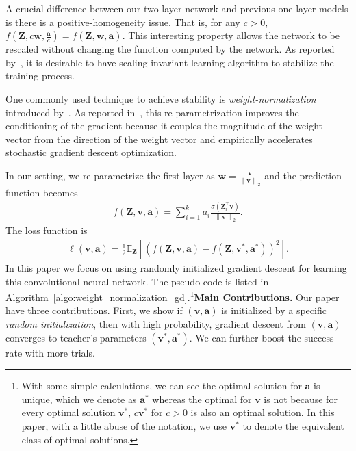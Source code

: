 \documentclass{article}
\newcommand{\firstlayerWN}{v}
\newcommand{\secondlayer}{a}
\def\va{\mathbf{a}}
\def\vv{\mathbf{v}}
\newcommand{\mat}[1]{\mathbf{#1}}
\newcommand{\vect}[1]{\mathbf{#1}}
\newcommand{\norm}[1]{\left\|#1\right\|}
\newcommand{\expect}{\mathbb{E}}
\newcommand{\relu}[1]{\sigma\left(#1\right)}
\begin{document}
A crucial difference between our two-layer network and previous one-layer models is there is a positive-homogeneity issue.
That is, for any $c > 0$, $f\left(\mat{Z},c\vect{w},\frac{\vect{\secondlayer}}{c}\right) = f\left(\mat{Z},\vect{w},\vect{\secondlayer}\right)$.
This interesting
property allows the network to be rescaled without changing the function computed by the network.
As reported by~\cite{neyshabur2015path}, it is desirable to have scaling-invariant learning algorithm to stabilize the training process.

One commonly used technique to achieve stability is \emph{weight-normalization} introduced by~\citet{salimans2016weight}.
As reported in~\cite{salimans2016weight}, this re-parametrization improves the conditioning of the gradient  because it couples the magnitude of the weight vector from the direction of the weight vector and empirically accelerates  stochastic gradient descent optimization.



In our setting, we re-parametrize the first layer as $\vect{w} = \frac{\vect{\firstlayerWN}}{\norm{\vect{\firstlayerWN}}_2}$ and the prediction function becomes
\begin{align}
f\left(\mat{Z},\vect{\firstlayerWN},\vect{\secondlayer}\right) = \sum_{i=1}^{k} {\secondlayer}_i \frac{\relu{\mat{Z}_i^\top \vect{\firstlayerWN}}}{\norm{\vect{\firstlayerWN}}_2}. %
\end{align}
The loss function is
\begin{align}
\ell\left(\vect{\vect{\firstlayerWN},\vect{\secondlayer}}\right) = \frac{1}{2}\expect_{\mat{Z}}\left[\left(f\left(\mat{Z},\vect{\firstlayerWN},\vect{\secondlayer}\right) - f\left(\mat{Z},\vect{\firstlayerWN}^*,\vect{\secondlayer}^*\right)\right)^2\right]. \label{eqn:pop_obj_WN}
\end{align}
In this paper we focus on using randomly initialized gradient descent for learning this convolutional neural network.
The pseudo-code is listed in Algorithm~\ref{algo:weight_normalization_gd}.\footnote{With some simple calculations, we can see the optimal solution for $\vect{\secondlayer}$ is unique, which we denote as $\vect{\secondlayer}^*$ whereas the optimal for $\vect{\firstlayerWN}$ is not because for every optimal solution $\vect{\firstlayerWN}^*$, $c\vect{\firstlayerWN}^*$ for $c>0$ is also an optimal solution.
In this paper, with a little abuse of the notation, we use $\vect{\firstlayerWN}^*$ to denote the equivalent class of optimal solutions.
}\textbf{Main Contributions.} Our paper have three contributions. First, we show if $(\vect{\firstlayerWN},\vect{\secondlayer})$ is initialized by a specific \emph{random initialization}, then with high probability,
gradient descent from $(\vect{\firstlayerWN},\vect{\secondlayer})$ converges to teacher's parameters $(\vv^*, \va^*)$. We can further boost the success rate with more trials.
\end{document}
